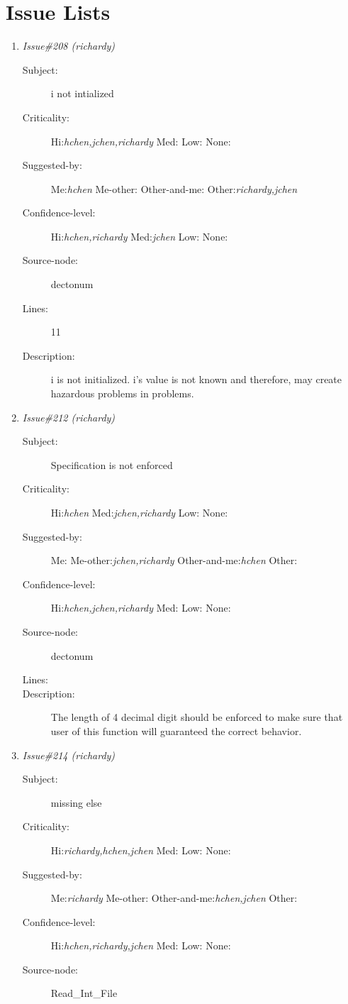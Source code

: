 \section{Issue Lists}
\begin{enumerate}
\item {\it Issue\#208 (richardy)}
\begin{description}
\item [Subject:] i not intialized
\item [Criticality:] Hi:{\it hchen,jchen,richardy} Med:{\it } Low:{\it } None:{\it }
\item [Suggested-by:] Me:{\it hchen} Me-other:{\it } Other-and-me:{\it } Other:{\it richardy,jchen}
\item [Confidence-level:] Hi:{\it hchen,richardy} Med:{\it jchen} Low:{\it } None:{\it }
\item [Source-node:] dectonum

\item [Lines:] 11

\item [Description:] i is not initialized.  i's value is not known
and therefore, may create hazardous problems in problems.
\end{description}
\item {\it Issue\#212 (richardy)}
\begin{description}
\item [Subject:] Specification is not enforced
\item [Criticality:] Hi:{\it hchen} Med:{\it jchen,richardy} Low:{\it } None:{\it }
\item [Suggested-by:] Me:{\it } Me-other:{\it jchen,richardy} Other-and-me:{\it hchen} Other:{\it }
\item [Confidence-level:] Hi:{\it hchen,jchen,richardy} Med:{\it } Low:{\it } None:{\it }
\item [Source-node:] dectonum

\item [Lines:] 

\item [Description:] The length of 4 decimal digit should be
enforced to make sure that user of this function will guaranteed the correct
behavior.
\end{description}
\item {\it Issue\#214 (richardy)}
\begin{description}
\item [Subject:] missing else
\item [Criticality:] Hi:{\it richardy,hchen,jchen} Med:{\it } Low:{\it } None:{\it }
\item [Suggested-by:] Me:{\it richardy} Me-other:{\it } Other-and-me:{\it hchen,jchen} Other:{\it }
\item [Confidence-level:] Hi:{\it hchen,richardy,jchen} Med:{\it } Low:{\it } None:{\it }
\item [Source-node:] Read\_Int\_File


\end{description}
\end{enumerate}
